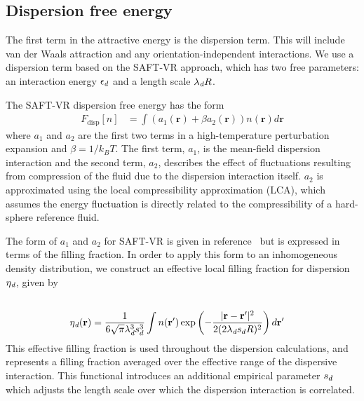 \documentclass[letterpaper,twocolumn,amsmath,amssymb,prb]{revtex4-1}
\newcommand{\xx}{\textbf{r}}
\begin{document}
\subsection{Dispersion free energy}
The first term in the attractive energy is the dispersion term.  This
will include van der Waals attraction and any orientation-independent
interactions. We use a dispersion term based on the SAFT-VR
approach\cite{gil-villegas-1997-SAFT-VR}, which has two free
parameters: an interaction energy $\epsilon_\textit{d}$ and a
length scale $\lambda_\textit{d} R$.

The SAFT-VR dispersion free energy has the form~\cite{gil-villegas-1997-SAFT-VR}
\begin{align}
  F_\text{disp}[n] &= \int \left(a_1(\xx) + \beta a_2(\xx)\right)n(\xx)d\xx
\end{align}
where $a_1$ and $a_2$ are the first two terms in a high-temperature
perturbation expansion and $\beta=1/k_BT$.  The first term, $a_1$, is 
the mean-field dispersion interaction and the second term, $a_2$, describes the
effect of fluctuations resulting from compression of the fluid due
to the dispersion interaction itself. $a_2$ is approximated
using the local compressibility approximation (LCA), which
assumes the energy fluctuation is directly related to the
compressibility of a hard-sphere reference fluid\cite{barker1976liquid}.

The form of $a_1$ and $a_2$ for SAFT-VR is given in
reference~\cite{gil-villegas-1997-SAFT-VR} but is expressed in terms
of the filling fraction.  In order to apply this form to an
inhomogeneous density distribution, we construct an effective local
filling fraction for dispersion $\eta_\textit{d}$, given by
\begin{align}
  \\
  \etadisp(\xx) &= \frac{1}{6\sqrt{\pi} \lambdadisp^3\lscale^3}
  \int n(\xx')\exp\left({-\frac{|\xx-\xx'|^2}{2(2 \lambdadisp
      \lscale R)^2}}\right)d\xx'
\end{align}
This effective filling fraction is used throughout the dispersion
calculations, and represents a filling fraction averaged over the
effective range of the dispersive interaction.  This functional
introduces an additional empirical parameter $s_d$ which adjusts
the length scale over which the dispersion interaction is correlated.
\end{document}
